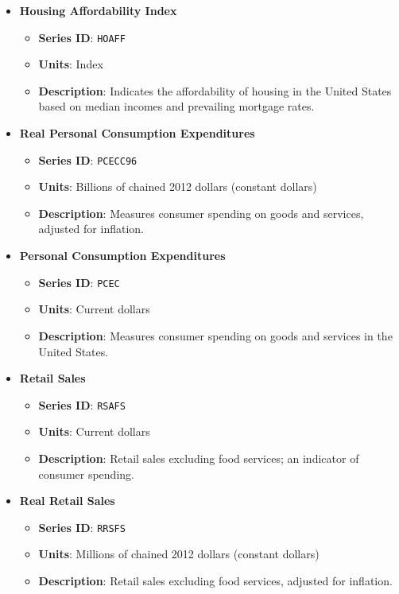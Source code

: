 \documentclass{article}
\begin{document}
\begin{itemize}
    \item \textbf{Housing Affordability Index}
    \begin{itemize}
        \item \textbf{Series ID}: \texttt{HOAFF}
        \item \textbf{Units}: Index
        \item \textbf{Description}: Indicates the affordability of housing in the United States based on median incomes and prevailing mortgage rates.
    \end{itemize}
    
    \item \textbf{Real Personal Consumption Expenditures}
    \begin{itemize}
        \item \textbf{Series ID}: \texttt{PCECC96}
        \item \textbf{Units}: Billions of chained 2012 dollars (constant dollars)
        \item \textbf{Description}: Measures consumer spending on goods and services, adjusted for inflation.
    \end{itemize}

    \item \textbf{Personal Consumption Expenditures}
    \begin{itemize}
        \item \textbf{Series ID}: \texttt{PCEC}
        \item \textbf{Units}: Current dollars
        \item \textbf{Description}: Measures consumer spending on goods and services in the United States.
    \end{itemize}
    
    \item \textbf{Retail Sales}
    \begin{itemize}
        \item \textbf{Series ID}: \texttt{RSAFS}
        \item \textbf{Units}: Current dollars
        \item \textbf{Description}: Retail sales excluding food services; an indicator of consumer spending.
    \end{itemize}

    \item \textbf{Real Retail Sales}
    \begin{itemize}
        \item \textbf{Series ID}: \texttt{RRSFS}
        \item \textbf{Units}: Millions of chained 2012 dollars (constant dollars)
        \item \textbf{Description}: Retail sales excluding food services, adjusted for inflation.
    \end{itemize}

\end{itemize}    
\end{document}
